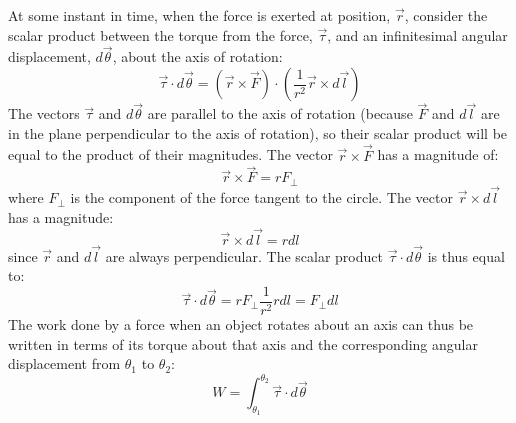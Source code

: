At some instant in time, when the force is exerted at position, $\vec r$, consider the scalar product between the torque from the force, $\vec \tau$, and an infinitesimal angular displacement, $d\vec \theta$, about the axis of rotation:
\begin{equation}
\vec\tau \cdot d\vec\theta = (\vec r \times \vec F) \cdot \left(\frac{1}{r^2} \vec r\times d\vec l\right)
\end{equation}
The vectors $\vec \tau$ and $d\vec \theta$ are parallel to the axis of rotation (because $\vec F$ and $d\vec l$ are in the plane perpendicular to the axis of rotation), so their scalar product will be equal to the product of their magnitudes. The vector $\vec r \times \vec F$ has a magnitude of:
\begin{equation}
\vec r \times \vec F = rF_\perp
\end{equation}
where $F_\perp$ is the component of the force tangent to the circle. The vector $\vec r\times d\vec l$ has a magnitude:
\begin{equation}
\vec r\times d\vec l = rdl
\end{equation}
since $\vec r$ and $d\vec l$ are always perpendicular. The scalar product $\vec\tau \cdot d\vec\theta$ is thus equal to:
\begin{equation}
\vec\tau \cdot d\vec\theta = rF_\perp \frac{1}{r^2} rdl = F_\perp dl
\end{equation}
The work done by a force when an object rotates about an axis can thus be written in terms of its torque about that axis and the corresponding angular displacement from $\theta_1$ to $\theta_2$:
\begin{equation}
W = \int_{\theta_1}^{\theta_2}\vec\tau\cdot d\vec \theta
\end{equation}

